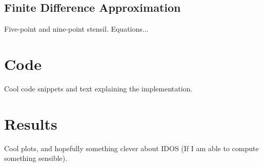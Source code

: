 \documentclass{article}
\begin{document}
\subsection{Finite Difference Approximation}
Five-point and nine-point stensil. Equations...

\section{Code}
Cool code snippets and text explaining the implementation.

\section{Results}
Cool plots, and hopefully something clever about IDOS (If I am able to compute something sensible).
\end{document}
